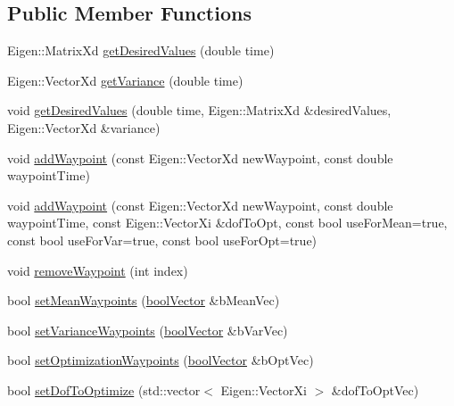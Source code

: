 \subsection*{Public Member Functions}
\begin{DoxyCompactItemize}
\item 
Eigen\+::\+Matrix\+Xd \hyperlink{classocra_1_1GaussianProcessTrajectory_a629f8e01ed88d4aa69e0a2ed9a442bda}{get\+Desired\+Values} (double time)
\item 
Eigen\+::\+Vector\+Xd \hyperlink{classocra_1_1GaussianProcessTrajectory_ac90c0664984dabfb530aa0437ec0a740}{get\+Variance} (double time)
\item 
void \hyperlink{classocra_1_1GaussianProcessTrajectory_a5ae11f8f2525d4b92236b1df20b1a9d7}{get\+Desired\+Values} (double time, Eigen\+::\+Matrix\+Xd \&desired\+Values, Eigen\+::\+Vector\+Xd \&variance)
\item 
void \hyperlink{classocra_1_1GaussianProcessTrajectory_af5b02e851e386e189b64038b429d37c6}{add\+Waypoint} (const Eigen\+::\+Vector\+Xd new\+Waypoint, const double waypoint\+Time)
\item 
void \hyperlink{classocra_1_1GaussianProcessTrajectory_ae6f9369c9494f40790e08c572c3e2bba}{add\+Waypoint} (const Eigen\+::\+Vector\+Xd new\+Waypoint, const double waypoint\+Time, const Eigen\+::\+Vector\+Xi \&dof\+To\+Opt, const bool use\+For\+Mean=true, const bool use\+For\+Var=true, const bool use\+For\+Opt=true)
\item 
void \hyperlink{classocra_1_1GaussianProcessTrajectory_a56de119b85b7646942cb85f434be7e43}{remove\+Waypoint} (int index)
\item 
bool \hyperlink{classocra_1_1GaussianProcessTrajectory_abdafe69c3db6d514bbe8ae5f560cf466}{set\+Mean\+Waypoints} (\hyperlink{namespaceocra_afaf4559cfedb560f8d1fe9bf6a21678f}{bool\+Vector} \&b\+Mean\+Vec)
\item 
bool \hyperlink{classocra_1_1GaussianProcessTrajectory_ae41d4aadfdc7cf0da1cb5e141fdaad96}{set\+Variance\+Waypoints} (\hyperlink{namespaceocra_afaf4559cfedb560f8d1fe9bf6a21678f}{bool\+Vector} \&b\+Var\+Vec)
\item 
bool \hyperlink{classocra_1_1GaussianProcessTrajectory_a422e7c21958eded0e101ea9a0198e2f6}{set\+Optimization\+Waypoints} (\hyperlink{namespaceocra_afaf4559cfedb560f8d1fe9bf6a21678f}{bool\+Vector} \&b\+Opt\+Vec)
\item 
bool \hyperlink{classocra_1_1GaussianProcessTrajectory_ade78792c6b17174f77c0e0c60d4d4755}{set\+Dof\+To\+Optimize} (std\+::vector$<$ Eigen\+::\+Vector\+Xi $>$ \&dof\+To\+Opt\+Vec)

\end{DoxyCompactItemize}

